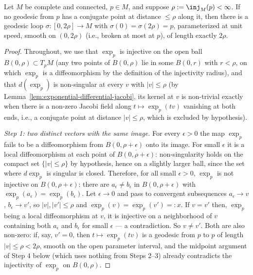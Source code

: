 \begin{lemma}
\label{lem:klingenberg-loop}
Let $M$ be complete and connected, $p\in M$, and suppose
$\rho:=\inj_M(p)<\infty$. If no geodesic from $p$ has a conjugate point at distance
$\le\rho$ along it, then there is a geodesic loop $\sigma\colon
[0,2\rho]\to M$ with $\sigma(0)=\sigma(2\rho)=p$, parameterized at
unit speed, smooth on $(0,2\rho)$ (i.e., broken at most at $p$), of
length exactly $2\rho$.
\end{lemma}

\begin{proof}
Throughout, we use that $\exp_p$ is injective on the open ball
$B(0,\rho)\subset T_pM$ (any two points of $B(0,\rho)$ lie in some
$B(0,r)$ with $r<\rho$, on which $\exp_p$ is a diffeomorphism by
the definition of the injectivity radius), and that
$d(\exp_p)$ is non-singular at every $v$ with $|v|\le\rho$ (by
Lemma~\ref{lem:exponential-differential-jacobi}, its
kernel at $v$ is non-trivial exactly when there is a non-zero
Jacobi field along $t\mapsto
\exp_p(tv)$ vanishing at both ends, i.e., a conjugate point at
distance $|v|\le\rho$, which is excluded by hypothesis).

\emph{Step 1: two distinct vectors with the same image.} For every
$\epsilon>0$ the map $\exp_p$ fails to be a diffeomorphism from
$B(0,\rho+\epsilon)$ onto its image. For small $\epsilon$ it is a
local diffeomorphism at each point of
$\overline{B(0,\rho+\epsilon)}$: non-singularity holds on the
compact set $\{|v|\le\rho\}$ by hypothesis, hence on a slightly
larger ball, since the set where $d\exp_p$ is singular is
closed. Therefore, for all small $\epsilon>0$, $\exp_p$ is not
injective on $B(0,\rho+\epsilon)$: there are $a_\epsilon\not=
b_\epsilon$ in $B(0,\rho+\epsilon)$ with
$\exp_p(a_\epsilon)=\exp_p(b_\epsilon)$. Let
$\epsilon\to0$ and pass to convergent subsequences $a_\epsilon\to
v$, $b_\epsilon\to v'$, so $|v|,|v'|\le\rho$ and
$\exp_p(v)=\exp_p(v')=:x$. If $v=v'$ then, $\exp_p$
being a local diffeomorphism at $v$, it is injective on a
neighborhood of $v$ containing both $a_\epsilon$ and $b_\epsilon$
for small $\epsilon$ --- a contradiction. So $v\not=v'$. Both are also non-zero: if, say, $v'=0$, then
$t\mapsto\exp_p(tv)$ is a geodesic from $p$ to $p$ of length
$|v|\le\rho<2\rho$, smooth on the open parameter interval, and the
midpoint argument of Step 4 below (which uses nothing from Steps
2--3) already contradicts the injectivity of $\exp_p$ on
$B(0,\rho)$.


\end{proof}
